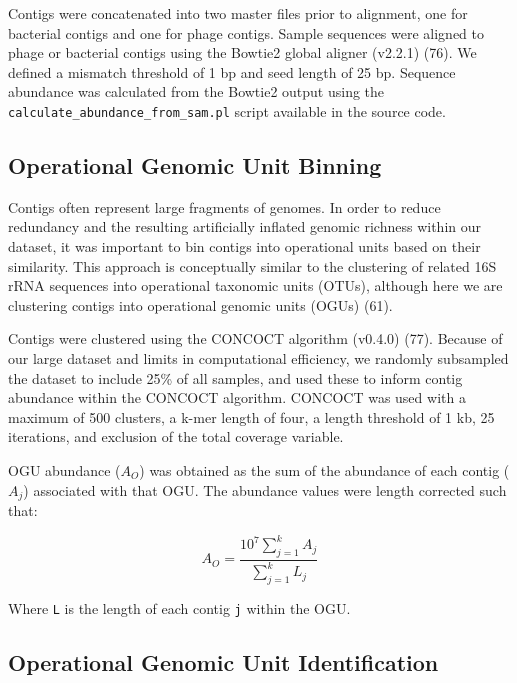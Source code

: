 \documentclass[12pt,]{article}
\begin{document}
Contigs were concatenated into two master files prior to alignment, one
for bacterial contigs and one for phage contigs. Sample sequences were
aligned to phage or bacterial contigs using the Bowtie2 global aligner
(v2.2.1) (76). We defined a mismatch threshold of 1 bp and seed length
of 25 bp. Sequence abundance was calculated from the Bowtie2 output
using the \texttt{calculate\_abundance\_from\_sam.pl} script available
in the source code.

\subsection{Operational Genomic Unit
Binning}\label{operational-genomic-unit-binning}

Contigs often represent large fragments of genomes. In order to reduce
redundancy and the resulting artificially inflated genomic richness
within our dataset, it was important to bin contigs into operational
units based on their similarity. This approach is conceptually similar
to the clustering of related 16S rRNA sequences into operational
taxonomic units (OTUs), although here we are clustering contigs into
operational genomic units (OGUs) (61).

Contigs were clustered using the CONCOCT algorithm (v0.4.0) (77).
Because of our large dataset and limits in computational efficiency, we
randomly subsampled the dataset to include 25\% of all samples, and used
these to inform contig abundance within the CONCOCT algorithm. CONCOCT
was used with a maximum of 500 clusters, a k-mer length of four, a
length threshold of 1 kb, 25 iterations, and exclusion of the total
coverage variable.

OGU abundance (\(A_{O}\)) was obtained as the sum of the abundance of
each contig (\(A_{j}\)) associated with that OGU. The abundance values
were length corrected such that:

\[ { A }_{ O }=\frac { { 10 }^{ 7 }\sum _{ j=1 }^{ k }{ { A }_{ j } }  }{ \sum _{ j=1 }^{ k }{ { L }_{ j } }  } \]

Where \texttt{L} is the length of each contig \texttt{j} within the OGU.

\subsection{Operational Genomic Unit
Identification}\label{operational-genomic-unit-identification}
\end{document}
